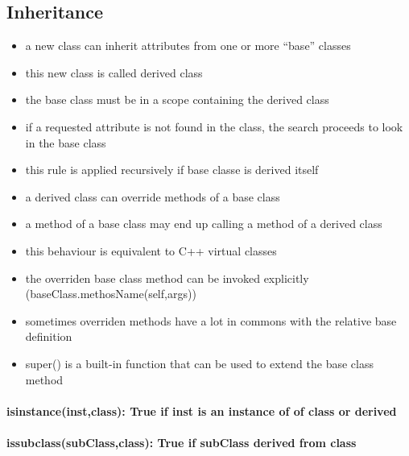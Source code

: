 \documentclass[11pt]{article}
\providecommand{\tightlist}{%
      \setlength{\itemsep}{0pt}\setlength{\parskip}{0pt}}
\begin{document}
    \hypertarget{inheritance}{%
\subsection{Inheritance}\label{inheritance}}

\begin{itemize}
\tightlist
\item
  a new class can inherit attributes from one or more ``base'' classes
\item
  this new class is called derived class
\item
  the base class must be in a scope containing the derived class
\item
  if a requested attribute is not found in the class, the search
  proceeds to look in the base class\\
\item
  this rule is applied recursively if base classe is derived itself
\item
  a derived class can override methods of a base class
\item
  a method of a base class may end up calling a method of a derived
  class
\item
  this behaviour is equivalent to C++ virtual classes
\item
  the overriden base class method can be invoked explicitly
  (baseClass.methosName(self,args))
\item
  sometimes overriden methods have a lot in commons with the relative
  base definition
\item
  super() is a built-in function that can be used to extend the base
  class method
\end{itemize}

\hypertarget{isinstanceinstclass-true-if-inst-is-an-instance-of-of-class-or-derived}{%
\paragraph{isinstance(inst,class): True if inst is an instance of of
class or
derived}\label{isinstanceinstclass-true-if-inst-is-an-instance-of-of-class-or-derived}}

\hypertarget{issubclasssubclassclass-true-if-subclass-derived-from-class}{%
\paragraph{issubclass(subClass,class): True if subClass derived from
class}\label{issubclasssubclassclass-true-if-subclass-derived-from-class}}
\end{document}

